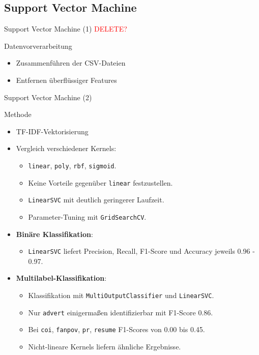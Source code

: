 \documentclass[aspectratio=169]{beamer} %
\begin{document}
\subsection{Support Vector Machine}

\begin{frame}{Support Vector Machine (1)}
    \textcolor{red}{DELETE?}
    \begin{block}{Datenvorverarbeitung}
        \begin{itemize}
            \item Zusammenf\"uhren der CSV-Dateien
            \item Entfernen \"uberfl\"ussiger Features
        \end{itemize}
    \end{block}
\end{frame}

\begin{frame}{Support Vector Machine (2)}
    \begin{block}{Methode}
        \begin{itemize}
            \item TF-IDF-Vektorisierung
            \item Vergleich verschiedener Kernels:
                \begin{itemize}
                    \item \texttt{linear}, \texttt{poly}, \texttt{rbf}, \texttt{sigmoid}.
                    \item Keine Vorteile gegen\"uber \texttt{linear} festzustellen.
                    \item \texttt{LinearSVC} mit deutlich geringerer Laufzeit.
                    \item Parameter-Tuning mit \texttt{GridSearchCV}.
                \end{itemize}
            \item \textbf{Bin\"are Klassifikation}:
                \begin{itemize}
                    \item \texttt{LinearSVC} liefert Precision, Recall, F1-Score und Accuracy jeweils 0.96 - 0.97.
                \end{itemize}
            \item \textbf{Multilabel-Klassifikation}:
                \begin{itemize}
                    \item Klassifikation mit \texttt{MultiOutputClassifier} und \texttt{LinearSVC}.
                    \item Nur \texttt{advert} einigerma\ss{}en identifizierbar mit F1-Score 0.86.
                    \item Bei \texttt{coi}, \texttt{fanpov}, \texttt{pr}, \texttt{resume} F1-Scores von 0.00 bis 0.45.
                    \item Nicht-lineare Kernels liefern \"ahnliche Ergebnisse.
                \end{itemize}
        \end{itemize}
    \end{block}
\end{frame}
\end{document}
